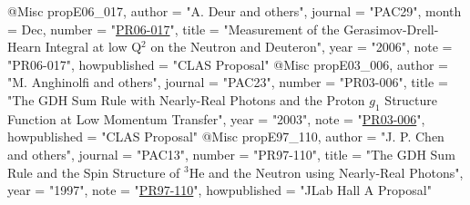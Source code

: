 @Misc{ propE06_017,
	author = "A. Deur and others",
	journal = "PAC29",
	month = Dec,
	number = "\href{http://www.jlab.org/exp_prog/proposals/06/PR06-017.pdf}{PR06-017}",
	title = "{Measurement of the Gerasimov-Drell-Hearn Integral at low Q$^{2}$ on the Neutron and Deuteron}",
	year = "2006",
	note = "PR06-017",
	howpublished = "CLAS Proposal"
}
@Misc{ propE03_006,
	author = "{M. Anghinolfi and others}",
	journal = "PAC23",
	number = "PR03-006",
	title = "{The GDH Sum Rule with Nearly-Real Photons and the Proton $g_1$ Structure Function at Low Momentum Transfer}",
	year = "2003",
	note = "\href{http://www.jlab.org/exp_prog/proposals/03/PR03-006.pdf}{PR03-006}",
	howpublished = "CLAS Proposal"
}
@Misc{ propE97_110,
	author = "{J. P. Chen and others}",
	journal = "PAC13",
	number = "PR97-110",
	title = "{The GDH Sum Rule and the Spin Structure of $^3$He and the Neutron using Nearly-Real Photons}",
	year = "1997",
	note = "\href{http://www.jlab.org/exp_prog/proposals/97/PR97-110.pdf}{PR97-110}",
	howpublished = "JLab Hall A Proposal"
}


